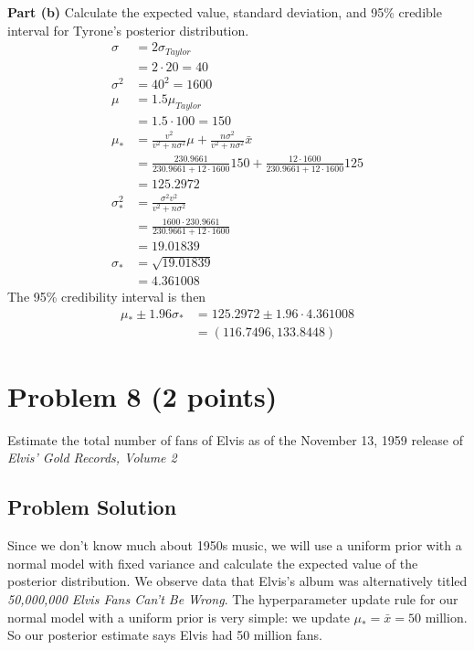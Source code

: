 \documentclass[12pt]{article}
\theoremstyle{definition}
\begin{document}
\noindent
{\bf Part (b)} Calculate the expected value, standard deviation, and 95\% credible interval for Tyrone's posterior distribution.
\begin{align*}
\sigma &= 2\sigma_{Taylor}\\
&= 2\cdot 20 = 40\\
\sigma^2 &= 40^2 = 1600\\
\mu &= 1.5 \mu_{Taylor}\\
&= 1.5 \cdot 100 = 150\\
\mu_* &= \frac{v^2}{v^2 + n\sigma^2}\mu + \frac{n\sigma^2}{v^2 + n\sigma^2}\bar{x}\\
&= \frac{230.9661}{230.9661 + 12\cdot 1600}150 + \frac{12\cdot 1600}{230.9661 + 12\cdot 1600}125\\
&= 125.2972\\
\sigma_*^2 &= \frac{\sigma^2 v^2}{v^2 + n\sigma^2}\\
&= \frac{1600 \cdot 230.9661}{230.9661 + 12 \cdot 1600}\\
&= 19.01839\\
\sigma_* &= \sqrt{19.01839}\\
&= 4.361008
\end{align*}
The 95\% credibility interval is then
\begin{align*}
\mu_* \pm 1.96\sigma_* &= 125.2972\pm 1.96\cdot 4.361008\\
&= (116.7496, 133.8448)
\end{align*}

\newpage
\section*{Problem 8 (2 points)}

Estimate the total number of fans of Elvis as of the November 13, 1959 release of {\em Elvis' Gold Records, Volume 2}

\subsection*{Problem Solution}


Since we don't know much about 1950s music, we will use a uniform prior with a normal model with fixed variance and calculate the expected value of the posterior distribution. We observe data that Elvis's album was alternatively titled \textit{50,000,000 Elvis Fans Can't Be Wrong}. The hyperparameter update rule for our normal model with a uniform prior is very simple: we update $\mu_* = \bar{x} = 50$ million. So our posterior estimate says Elvis had 50 million fans.
\end{document}
